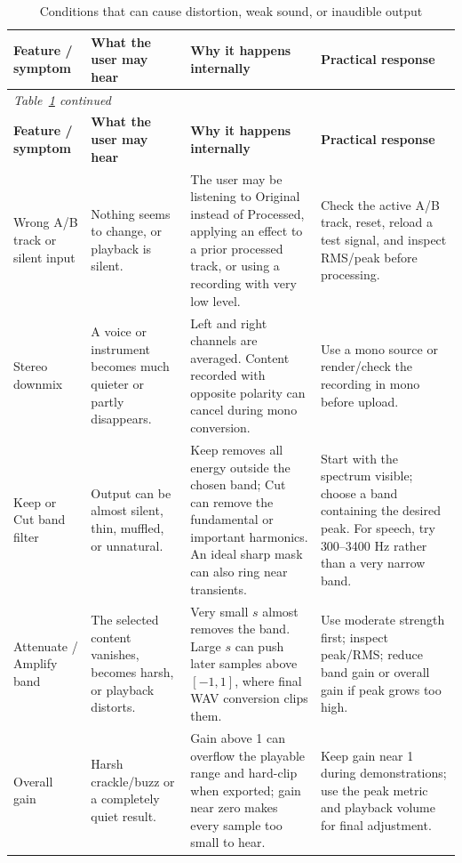 \documentclass[11pt,a4paper]{article}
\renewcommand{\arraystretch}{1.22}
\begin{document}
{\small
\setlength{\tabcolsep}{2pt}
\renewcommand{\arraystretch}{1.3}
\begin{longtable}{@{}p{.19\linewidth}p{.23\linewidth}p{.32\linewidth}p{.18\linewidth}@{}}
\caption{Conditions that can cause distortion, weak sound, or inaudible output}\label{tab:audio-cautions}\\
\toprule
\textbf{Feature / symptom} & \textbf{What the user may hear} & \textbf{Why it happens internally} & \textbf{Practical response}\\
\midrule
\endfirsthead
\multicolumn{4}{l}{\small\itshape Table~\ref{tab:audio-cautions} continued}\\
\toprule
\textbf{Feature / symptom} & \textbf{What the user may hear} & \textbf{Why it happens internally} & \textbf{Practical response}\\
\midrule
\endhead
\bottomrule
\endfoot

Wrong A/B track or silent input & Nothing seems to change, or playback is silent. & The user may be listening to Original instead of Processed, applying an effect to a prior processed track, or using a recording with very low level. & Check the active A/B track, reset, reload a test signal, and inspect RMS/peak before processing.\\

Stereo downmix & A voice or instrument becomes much quieter or partly disappears. & Left and right channels are averaged. Content recorded with opposite polarity can cancel during mono conversion. & Use a mono source or render/check the recording in mono before upload.\\

Keep or Cut band filter & Output can be almost silent, thin, muffled, or unnatural. & Keep removes all energy outside the chosen band; Cut can remove the fundamental or important harmonics. An ideal sharp mask can also ring near transients. & Start with the spectrum visible; choose a band containing the desired peak. For speech, try 300--3400 Hz rather than a very narrow band.\\

Attenuate / Amplify band & The selected content vanishes, becomes harsh, or playback distorts. & Very small \(s\) almost removes the band. Large \(s\) can push later samples above \([-1,1]\), where final WAV conversion clips them. & Use moderate strength first; inspect peak/RMS; reduce band gain or overall gain if peak grows too high.\\

Overall gain & Harsh crackle/buzz or a completely quiet result. & Gain above 1 can overflow the playable range and hard-clip when exported; gain near zero makes every sample too small to hear. & Keep gain near 1 during demonstrations; use the peak metric and playback volume for final adjustment.\\


\end{longtable}}
\end{document}
